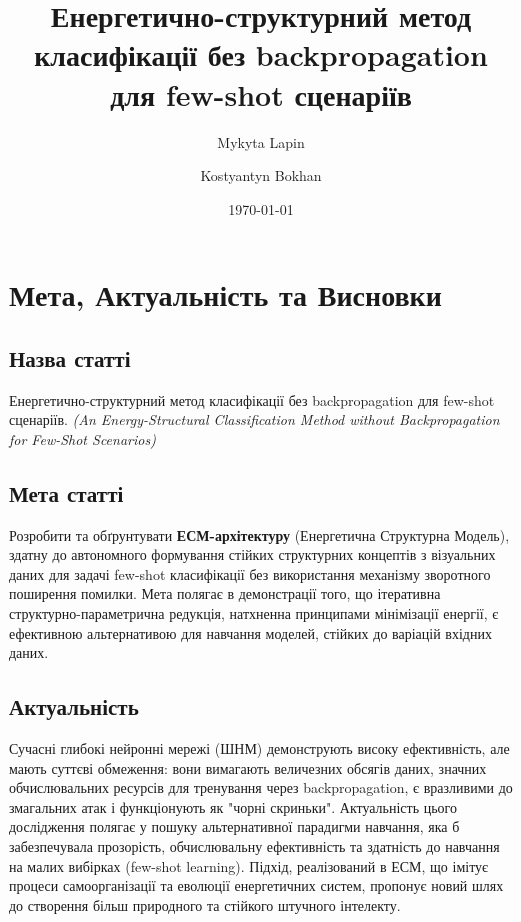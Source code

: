 \documentclass[12pt, a4paper]{article}
\title{\textbf{Енергетично-структурний метод класифікації без backpropagation для few-shot сценаріїв}}
\author{Mykyta Lapin \and Kostyantyn Bokhan}
\date{\today}
\begin{document}
\maketitle

\section*{Мета, Актуальність та Висновки}

\subsection*{Назва статті}
Енергетично-структурний метод класифікації без backpropagation для few-shot сценаріїв.
\newline\textit{(An Energy-Structural Classification Method without Backpropagation for Few-Shot Scenarios)}

\subsection*{Мета статті}
Розробити та обґрунтувати \textbf{ЕСМ-архітектуру} (Енергетична Структурна Модель), здатну до автономного формування стійких структурних концептів з візуальних даних для задачі few-shot класифікації без використання механізму зворотного поширення помилки. Мета полягає в демонстрації того, що ітеративна структурно-параметрична редукція, натхненна принципами мінімізації енергії, є ефективною альтернативою для навчання моделей, стійких до варіацій вхідних даних.

\subsection*{Актуальність}
Сучасні глибокі нейронні мережі (ШНМ) демонструють високу ефективність, але мають суттєві обмеження: вони вимагають величезних обсягів даних, значних обчислювальних ресурсів для тренування через backpropagation, є вразливими до змагальних атак і функціонують як "чорні скриньки". Актуальність цього дослідження полягає у пошуку альтернативної парадигми навчання, яка б забезпечувала прозорість, обчислювальну ефективність та здатність до навчання на малих вибірках (few-shot learning). Підхід, реалізований в ЕСМ, що імітує процеси самоорганізації та еволюції енергетичних систем, пропонує новий шлях до створення більш природного та стійкого штучного інтелекту.
\end{document}
